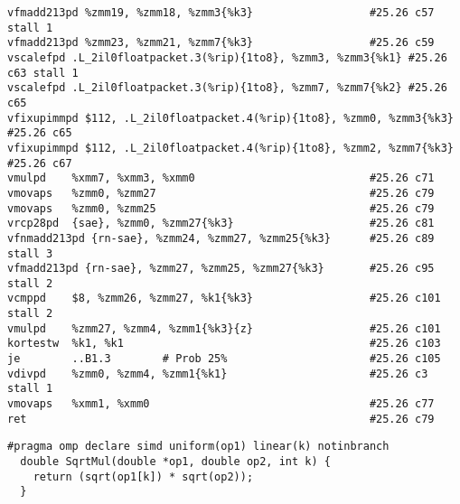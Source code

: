 \begin{verbatim}
vfmadd213pd %zmm19, %zmm18, %zmm3{%k3}                  #25.26 c57 stall 1
vfmadd213pd %zmm23, %zmm21, %zmm7{%k3}                  #25.26 c59
vscalefpd .L_2il0floatpacket.3(%rip){1to8}, %zmm3, %zmm3{%k1} #25.26 c63 stall 1
vscalefpd .L_2il0floatpacket.3(%rip){1to8}, %zmm7, %zmm7{%k2} #25.26 c65
vfixupimmpd $112, .L_2il0floatpacket.4(%rip){1to8}, %zmm0, %zmm3{%k3} #25.26 c65
vfixupimmpd $112, .L_2il0floatpacket.4(%rip){1to8}, %zmm2, %zmm7{%k3} #25.26 c67
vmulpd    %xmm7, %xmm3, %xmm0                           #25.26 c71
vmovaps   %zmm0, %zmm27                                 #25.26 c79
vmovaps   %zmm0, %zmm25                                 #25.26 c79
vrcp28pd  {sae}, %zmm0, %zmm27{%k3}                     #25.26 c81
vfnmadd213pd {rn-sae}, %zmm24, %zmm27, %zmm25{%k3}      #25.26 c89 stall 3
vfmadd213pd {rn-sae}, %zmm27, %zmm25, %zmm27{%k3}       #25.26 c95 stall 2
vcmppd    $8, %zmm26, %zmm27, %k1{%k3}                  #25.26 c101 stall 2
vmulpd    %zmm27, %zmm4, %zmm1{%k3}{z}                  #25.26 c101
kortestw  %k1, %k1                                      #25.26 c103
je        ..B1.3        # Prob 25%                      #25.26 c105
vdivpd    %zmm0, %zmm4, %zmm1{%k1}                      #25.26 c3 stall 1
vmovaps   %xmm1, %xmm0                                  #25.26 c77
ret                                                     #25.26 c79
\end{verbatim}

\begin{verbatim}
#pragma omp declare simd uniform(op1) linear(k) notinbranch
  double SqrtMul(double *op1, double op2, int k) {
    return (sqrt(op1[k]) * sqrt(op2));
  }
\end{verbatim}
